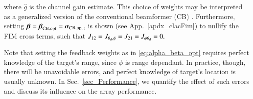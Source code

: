where $\hat{g}$ is the channel gain estimate.
This choice of weights may be interpreted as a generalized version of the conventional beamformer (CB) \cite{van2004optimum}. 
Furthermore, setting $\vBeta=\vBeta_{\text{CB,opt}}=\vAlpha_{\text{CB,opt}}$, is shown (see App.~\ref{apdx_clacFim}) to nullify the FIM cross terms, such that $J_{12}=J_{\theta_{\text{d}},\phi}=J_{21}=J_{\phi\theta_{\text{d}}}=0.$
\par Note that setting the feedback weights as in \eqref{eq:alpha_beta_opt} requires perfect knowledge of the target's range, since $\phi$ is range dependant. 
In practice, though, there will be unavoidable errors, and perfect knowledge of target's location is usually unknown.
In Sec.~\ref{sec_Performance}, we quantify the effect of such errors and discuss its influence on the array performance. 